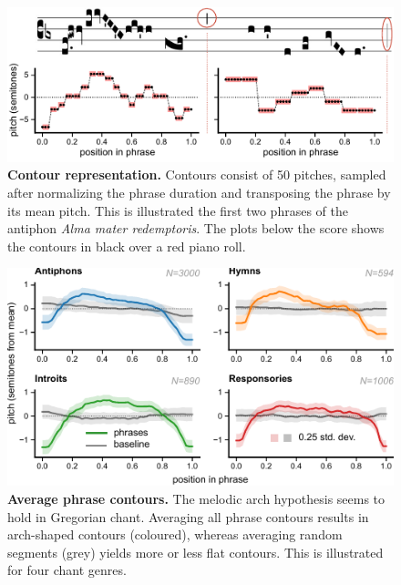 \documentclass[sigconf,screen]{acmart}
\begin{document}
\begin{figure}[t]
    \centering
    \includegraphics[width=\linewidth]{figures/fig03-contour-representation}
    \caption{\normalfont%
    \textbf{Contour representation.}
    Contours consist of 50 pitches, sampled after normalizing the phrase duration and transposing the phrase by its mean pitch. This is illustrated the first two phrases of the antiphon \emph{Alma mater redemptoris}. The plots below the score shows the contours in black over a red piano roll.
    }%
    \label{fig:contour-representation}
\end{figure}

\begin{figure}[t]
  \centering
  \includegraphics[width=\linewidth]{figures/fig04-average-phrase-contours.pdf}
  \caption{\normalfont%
    \textbf{Average phrase contours.} 
    The melodic arch hypothesis seems to hold in Gregorian chant.
    Averaging all phrase contours results in arch-shaped contours (coloured), whereas averaging random segments (grey) yields more or less flat contours.
    This is illustrated for four chant genres.
    }%
    \label{fig:average-phrase-contours}
\end{figure}
\end{document}
